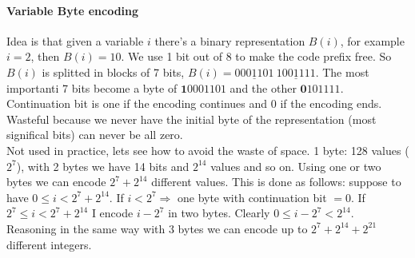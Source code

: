 \documentclass[10pt]{report}
\begin{document}
\paragraph{Variable Byte encoding} Idea is that given a variable $i$ there's a binary representation $B(i)$, for example $i = 2$, then $B(i) = 10$. We use 1 bit out of 8 to make the code prefix free. So $B(i)$ is splitted in blocks of 7 bits, $B(i) = \underline{\textit{000}1101}\:\underline{1001111}$. The most importanti 7 bits become a byte of $\textbf{1}0001101$ and the other $\textbf{0}101111$. Continuation bit is one if the encoding continues and 0 if the encoding ends.\\
Wasteful because we never have the initial byte of the representation (most significal bits) can never be all zero.\\
Not used in practice, lets see how to avoid the waste of space. 1 byte: 128 values ($2^7$), with 2 bytes we have 14 bits and $2^{14}$ values and so on. Using one or two bytes we can encode $2^7 + 2^{14}$ different values. This is done as follows: suppose to have $0\leq i < 2^7 + 2^{14}$. If $i < 2^7 \Rightarrow$ one byte with continuation bit $= 0$. If $2^7 \leq i < 2^7 + 2^{14}$ I encode $i-2^7$ in two bytes. Clearly $0\leq i - 2^7 < 2^{14}$.\\
Reasoning in the same way with 3 bytes we can encode up to $2^7 + 2^{14} + 2^{21}$ different integers.
\end{document}
